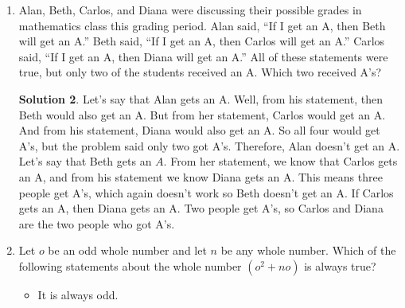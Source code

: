 \documentclass{article}
\theoremstyle{definition}
\newtheorem*{solution}{Solution}
\begin{document}
\begin{multicols*}{2}
\begin{enumerate}
\begin{center}
            \end{center}
            \begin{solution}
                To make the sum the greatest, put the three largest numbers $(13, 14, 15)$ in the corners.
                Then, balance the sides by putting the least integer $(10)$ between the greatest sum $(14 + 15)$.
                Then put the next lest integer $(11)$ between the next greatest sum $(13 + 15)$.
                Fill in the last integer $(12)$ and you can see that the sum of any three numbers on a side is (for example) $14 + 10 + 15 = 39$.
            \end{solution}
        \item Alan, Beth, Carlos, and Diana were discussing their possible grades in mathematics class this grading period.
            Alan said, ``If I get an A, then Beth will get an A.''
            Beth said, ``If I get an A, then Carlos will get an A.''
            Carlos said, ``If I get an A, then Diana will get an A.''
            All of these statements were true, but only two of the students received an A.
            Which two received A's?
            \begin{solution}
                Let's say that Alan gets an A. Well, from his statement, then Beth would also get an A.
                But from her statement, Carlos would get an A.
                And from his statement, Diana would also get an A.
                So all four would get A's, but the problem said only two got A's.
				Therefore, Alan doesn't get an A.
                Let's say that Beth gets an $A$.
                From her statement, we know that Carlos gets an A, and from his statement we know Diana gets an A.
				This means three people get A's, which again doesn't work so Beth doesn't get an A.
                If Carlos gets an A, then Diana gets an A.
				Two people get A's, so Carlos and Diana are the two people who got A's.
            \end{solution}
        \item Let $o$ be an odd whole number and let $n$ be any whole number.
            Which of the following statements about the whole number $(o^2 + no)$ is always true?
            \begin{itemize}
                \item It is always odd.

\end{itemize}
\end{enumerate}
\end{multicols*}
\end{document}
